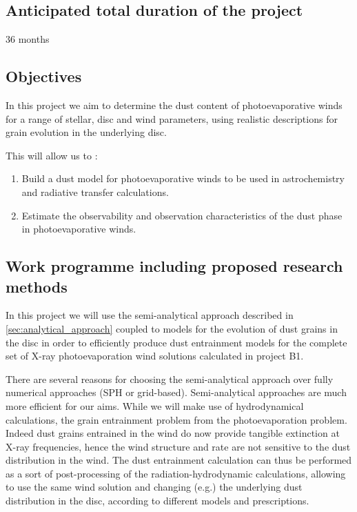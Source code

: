 \documentclass[10pt,fleqn,twoside]{article}
\newcommand{\Tcol}{\color{blue}}
\begin{document}
\subsection{\Tcol Anticipated total duration of the project}

36 months

\subsection{\Tcol Objectives}
In this project
we aim to determine the dust content of photoevaporative winds for a range of stellar, disc and wind parameters,
using realistic descriptions for grain evolution in the underlying
disc. 

This will allow us to : 
\begin{enumerate}
\item Build a dust model for photoevaporative winds to be used in
astrochemistry and radiative transfer calculations.
\item Estimate the observability and observation characteristics of
the dust phase in photoevaporative winds.
\end{enumerate}

\subsection{\Tcol Work programme including proposed research methods}

In this project we will use the semi-analytical approach described in
\cref{sec:analytical_approach} coupled to models for the
evolution of dust grains in the disc in order to efficiently produce
dust entrainment models for the complete set of X-ray photoevaporation
wind solutions calculated in project B1.

There are several reasons for choosing the semi-analytical approach
over fully numerical approaches (SPH or grid-based). Semi-analytical
approaches are much more efficient for our aims. While we will make
use of hydrodynamical calculations, the 
grain entrainment problem from the photoevaporation problem. Indeed
dust grains entrained in the wind do now provide tangible extinction
at X-ray frequencies, hence the wind structure and rate are
not sensitive to the dust distribution in the wind. The dust
entrainment calculation can thus be performed as a sort of
post-processing of the radiation-hydrodynamic calculations, allowing
to use the same wind solution and changing (e.g.) the underlying dust
distribution in the disc, according to different models and
prescriptions. 
\end{document}
